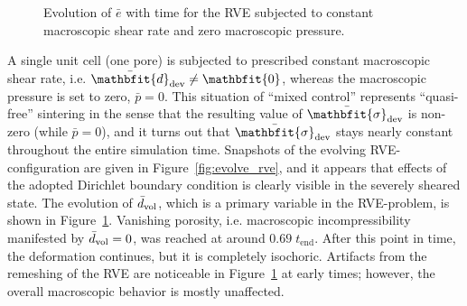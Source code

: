 \documentclass[12pt,a4paper,fleqn]{article}
\renewcommand{\ts}[1]{\mathbfit{#1}}
\newcommand{\figref}[1]{Figure~\ref{#1}}
\begin{document}
%
\begin{figure}[thpb!]
  \centering
  \caption{Evolution of $\bar{e}$ with time for the RVE subjected to constant macroscopic shear rate and zero macroscopic pressure.}
  \label{fig:evolve_graph}
\end{figure}


A single unit cell (one pore) is subjected to prescribed constant macroscopic shear rate, i.e. $\bar{\ts d}_\dev\neq \ts 0$, whereas the macroscopic pressure is set to zero, $\bar{p}=0$.
This situation of ``mixed control'' represents ``quasi-free'' sintering in the sense that the resulting value of $\bar{\ts\sigma}_\dev$ is non-zero (while $\bar p = 0 $), and it turns out that $\bar{\ts\sigma}_\dev$ stays nearly constant throughout the entire simulation time.
Snapshots of the evolving RVE-configuration are given in \figref{fig:evolve_rve}, and it appears that effects of the adopted Dirichlet boundary condition is clearly visible in the severely sheared state.
The evolution of $\bar d_{\mathrm{vol}}$, which is a primary variable in the RVE-problem, is shown in \figref{fig:evolve_graph}.
Vanishing porosity, i.e. macroscopic incompressibility manifested by $\bar d_{\mathrm{vol}} = 0$, was reached at around $0.69\;t_{\mathrm{end}}$.
After this point in time, the deformation continues, but it is completely isochoric.
Artifacts from the remeshing of the RVE are noticeable in \figref{fig:evolve_graph} at early times; however, the overall macroscopic behavior is mostly unaffected.
\end{document}
